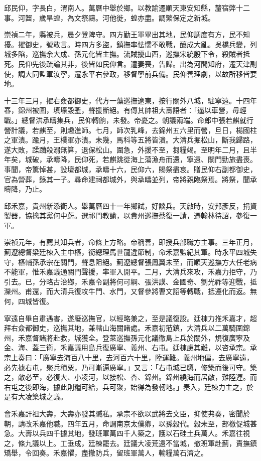 \begin{pinyinscope}
邱民仰，字長白，渭南人。萬曆中舉於鄉。以教諭遷順天東安知縣，釐宿弊十二事。河齧，歲旱蝗，為文祭禱。河他徙，蝗亦盡。調繁保定之新城。

崇禎二年，縣被兵，晨夕登陴守。四方勤王軍畢出其地，民仰調度有方，民不知擾。擢御史，號敢言。時四方多盜，鎮撫率怯懦不敢戰，釀成大亂。吳橋兵變，列城多陷，巡撫余大成、孫元化皆主撫。流賊擾山西，巡撫宋統殷下令，殺賊者抵死。民仰先後疏論其非，後皆如民仰言。遭妻喪，告歸。出為河間知府，遷天津副使，調大同監軍汝寧，遷永平右參政，移督寧前兵備。民仰善理劇，以故所移皆要地。

十三年三月，擢右僉都御史，代方一藻巡撫遼東，按行關外八城，駐寧遠。十四年春，錦州被圍，填壕毀塹，聲援斷絕。有傳其帥祖大壽語者：「逼以車營，毋輕戰。」總督洪承疇集兵，民仰轉餉，未發。帝憂之。朝議兩端。命郎中張若麒就行營計議，若麒至，則趣進師。七月，師次乳峰，去錦州五六里而營，旦日，楊國柱之軍潰。踰月，王樸軍亦潰。未幾，馬科等五將皆潰。大清兵掘松山，斷我歸路，遂大敗，蹂躪殺溺無算，退保松山。圍急，外援不至，芻糧竭。至明年二月，且半年矣，城破，承疇降，民仰死，若麒跳從海上蕩漁舟而還，寧遠、關門勁旅盡喪。事聞，帝驚悼甚，設壇都城，承疇十六，民仰六，賜祭盡哀。贈民仰右副都御史，官為營葬，錄其一子。尋命建祠都城外，與承疇並列，帝將親臨祭焉。將祭，聞承疇降，乃止。

邱禾嘉，貴州新添衛人。舉萬曆四十一年鄉試，好談兵。天啟時，安邦彥反，捐資製器，協擒其黨何中蔚。選祁門教諭，以貴州巡撫蔡復一請，遷翰林待詔，參復一軍。

崇禎元年，有薦其知兵者，命條上方略。帝稱善，即授兵部職方主事。三年正月，薊遼總督梁廷棟入主中樞，銜總理馬世龍違節制，命禾嘉監紀其軍。時永平四城失守，樞輔孫承宗在關門，聲息阻絕。薊遼總督張鳳翼未至，而順天巡撫方大任老病不能軍，惟禾嘉議通關門聲援，率軍入開平。二月，大清兵來攻，禾嘉力拒守，乃引去。已，分略古治鄉，禾嘉令副將何可綱、張洪謨、金國奇、劉光祚等迎戰，抵灤州。甫還，而大清兵復攻牛門、水門，又督參將曹文詔等轉戰，抵遵化而返。無何，四城皆復。

寧遠自畢自肅遇害，遂廢巡撫官，以經略兼之，至是議復設。廷棟力推禾嘉才，超拜右僉都御史，巡撫其地，兼轄山海關諸處。禾嘉初蒞鎮，大清兵以二萬騎圍錦州，禾嘉督諸將赴救，城獲全。登萊巡撫孫元化議徹島上兵於關外，規復廣寧及金、海、蓋三衛，禾嘉議用島兵復廣寧、義州、右屯。廷棟慮其難，以咨承宗。承宗上奏曰：「廣寧去海百八十里，去河百六十里，陸運難。義州地偏，去廣寧遠，必先據右屯，聚兵積粟，乃可漸逼廣寧。」又言：「右屯城已隳，修築而後可守。築之，敵必至，必復大、小凌河，以接松、杏、錦州。錦州繞海而居敵，難陸運。而右屯之後即海，據此則糧可給，兵可聚，始得為發軔地。」奏入，廷棟力主之，於是有大凌築城之議。

會禾嘉訐祖大壽，大壽亦發其贓私。承宗不欲以武將去文臣，抑使弗奏，密聞於朝，請改禾嘉他職。四年五月，命調南京太僕卿，以孫穀代。穀未至，部檄促城甚急。大壽以兵四千據其地，發班軍萬四千人築之，護以石硅土兵萬人。禾嘉往視之，條九議以上。工垂成，廷棟罷去。廷議大凌荒遠不當城，撤班軍赴薊，責撫鎮矯舉，令回奏。禾嘉懼，盡撤防兵，留班軍萬人，輸糧萬石濟之。


\end{pinyinscope}
